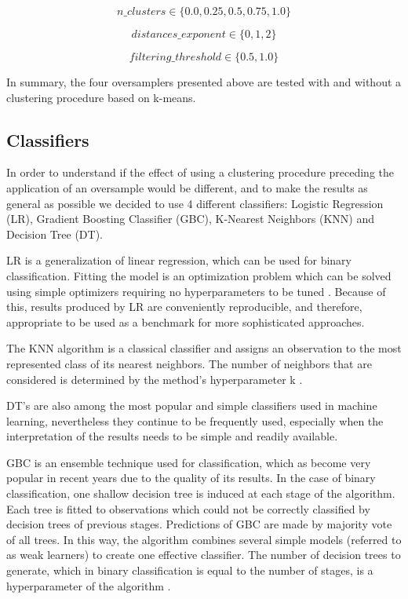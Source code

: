 \documentclass[parskip=full]{scrartcl}
\begin{document}
$$n\_clusters \in \{0.0, 0.25,0.5,0.75, 1.0\}$$

$$distances\_exponent \in \{0, 1, 2\}$$

$$filtering\_threshold \in \{0.5, 1.0\}$$

In summary, the four oversamplers presented above are tested with and without a 
clustering procedure based on k-means.

\subsection{Classifiers}

In order to understand if the effect of using a clustering procedure preceding 
the application of an oversample would be different, and to make the results as 
general as possible we decided to use 4 different classifiers: Logistic 
Regression (LR), Gradient Boosting Classifier (GBC), K-Nearest Neighbors (KNN) 
and Decision Tree (DT). 

LR is a generalization of linear regression, which can be used for binary 
classification. Fitting the model is an optimization problem which can be 
solved using simple optimizers requiring no hyperparameters to be tuned 
\cite{McCullagh1989}. Because of this, results produced by LR are conveniently 
reproducible, and therefore, appropriate to be used as a benchmark for more 
sophisticated approaches.

The KNN algorithm is a classical classifier and assigns an observation to the 
most represented class of its nearest neighbors. The number of neighbors that 
are considered is determined by the method’s hyperparameter k \cite{Fix1989}. 

DT’s \cite{Breiman1984} are also among the most popular and simple classifiers 
used in machine learning, nevertheless they continue to be frequently used, 
especially when the interpretation of the results needs to be simple and 
readily available. 

GBC is an ensemble technique used for classification, which as become very 
popular in recent years due to the quality of its results. In the case of 
binary classification, one shallow decision tree is induced at each stage of 
the algorithm. Each tree is fitted to observations which could not be correctly 
classified by decision trees of previous stages. Predictions of GBC are made by 
majority vote of all trees. In this way, the algorithm combines several simple 
models (referred to as weak learners) to create one effective classifier. The 
number of decision trees to generate, which in binary classification is equal 
to the number of stages, is a hyperparameter of the algorithm 
\cite{Friedman2001}.
\end{document}
